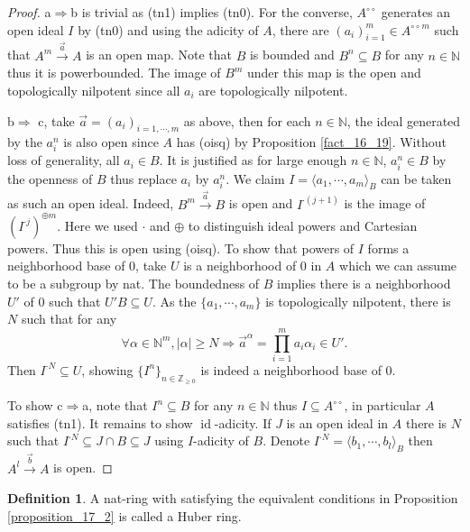 \documentclass[10pt]{article}
\numberwithin{equation}{section}
\theoremstyle{definition}
\newtheorem{definition}{Definition}[subsection]
\DeclareMathOperator{\id}{id}
\newcommand{\N}[0]{\mathbb{N}}
\newcommand{\Z}[0]{\mathbb{Z}}
\newcommand{\ab}[1]{\vert #1 \vert}
\newcommand{\dcirc}[0]{{\circ\circ}}
\begin{document}
\begin{proof}
    a$\Rightarrow$b is trivial as (tn1) implies (tn0). For the converse,  $A^\dcirc$ generates an open ideal $I$ by (tn0) and using the adicity of $A$, there are $(a_i)_{i=1}^m\in {A^\dcirc}^m$ such that $A^m\stackrel{\vec{a}}{\to} A$ is an open map.
    Note that $B$ is bounded and $B^n\subseteq B$ for any $n\in\N$ thus it is powerbounded. The image of $B^m$ under this map is the open and topologically nilpotent since all $a_i$ are topologically nilpotent.
    \par b$\Rightarrow$ c, take $\vec{a}=(a_i)_{i=1,\cdots,m}$ as above, then for each $n\in\N$, the ideal generated by the $a_i^n$ is also open since $A$ has (oisq) by Proposition \ref{fact_16_19}. Without loss of generality, all $a_i\in B$. It is justified as for large enough $n\in\N$, $a_i^n\in B$ by the openness of $B$ thus replace $a_i$ by $a_i^n$. We claim $I=\langle a_1,\cdots,a_m\rangle_B$ can be taken as such an open ideal. Indeed, $B^m\stackrel{\vec{a}}{\to} B$ is open and $I^{\cdot(j+1)}$ is the image of $(I^{\cdot j})^{\oplus m}$.
    Here we used $\cdot$ and $\oplus$ to distinguish ideal powers and Cartesian powers. Thus this is open using (oisq).
    To show that powers of $I$ forms a neighborhood base of $0$, take $U$ is a neighborhood of $0$ in $A$ which we can assume to be a subgroup by nat. The boundedness of $B$ implies there is a neighborhood $U'$ of $0$ such that $U'B\subseteq U$.
    As the $\{a_1,\cdots,a_m\}$ is topologically nilpotent, there is $N$ such that for any
    \begin{equation*}
    \forall\alpha\in\N^m,\ab{\alpha}\geq N\Rightarrow \vec{a}^\alpha = \prod_{i=1}^m a_i\alpha_i\in U'.
    \end{equation*}
    Then $I^{\cdot N}\subseteq U$, showing $\{I^n\}_{n\in\Z_{\geq0}}$ is indeed a neighborhood base of $0$.
    \par To show c$\Rightarrow$a, note that $I^n\subseteq B$ for any $n\in\N$ thus $I\subseteq A^\dcirc$, in particular $A$ satisfies (tn1). It remains to show $\id$-adicity.
    If $J$ is an open ideal in $A$ there is $N$ such that $I^{\cdot N}\subseteq J\cap B\subseteq J$ using $I$-adicity of $B$. Denote $I^{\cdot N}=\langle b_1,\cdots,b_l\rangle_B$ then $A^l\stackrel{\vec{b}}{\to}A$ is open.
\end{proof}

\begin{definition}
    \label{definition_17_3}
    A nat-ring with satisfying the equivalent conditions in Proposition \ref{proposition_17_2} is called a Huber ring.
\end{definition}
\end{document}

